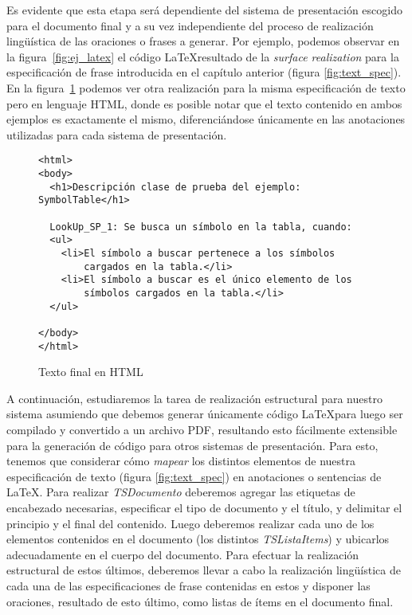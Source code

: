 Es evidente que esta etapa será dependiente del sistema de presentación escogido para el documento final y a su vez independiente del proceso de realización lingüística de las oraciones o frases a generar.  Por ejemplo, podemos observar en la figura~\ref{fig:ej_latex} el código \LaTeX resultado de la \textit{surface realization} para la especificación de frase introducida en el capítulo anterior (figura \ref{fig:text_spec}). En la figura~\ref{fig:ej_html} podemos ver otra realización para la misma especificación de texto pero en lenguaje HTML, donde es posible notar que el texto contenido en ambos ejemplos es exactamente el mismo, diferenciándose únicamente en las anotaciones utilizadas para cada sistema de presentación.

\begin{figure}[H]
  \begin{verbatim}
<html>
<body>
  <h1>Descripción clase de prueba del ejemplo: SymbolTable</h1>

  LookUp_SP_1: Se busca un símbolo en la tabla, cuando:
  <ul>
    <li>El símbolo a buscar pertenece a los símbolos 
        cargados en la tabla.</li>
    <li>El símbolo a buscar es el único elemento de los 
        símbolos cargados en la tabla.</li>
  </ul>

</body>
</html>
  \end{verbatim}
  \caption{Texto final en HTML}
  \label{fig:ej_html}
\end{figure}


A continuación, estudiaremos la tarea de realización estructural para nuestro sistema asumiendo que debemos generar únicamente código \LaTeX para luego ser compilado y convertido a un archivo PDF, resultando esto fácilmente extensible para la generación de código para otros sistemas de presentación. Para esto, tenemos que considerar cómo \emph{mapear} los distintos elementos de nuestra especificación de texto (figura \ref{fig:text_spec}) en anotaciones o sentencias de \LaTeX. Para realizar \emph{TSDocumento} deberemos agregar las etiquetas de encabezado necesarias, especificar el tipo de documento y el título, y delimitar el principio y el final del contenido. Luego deberemos realizar cada uno de los elementos contenidos en el documento (los distintos \emph{TSListaItems}) y ubicarlos adecuadamente en el cuerpo del documento. Para efectuar la realización estructural de estos últimos, deberemos llevar a cabo la realización lingüística de cada una de las especificaciones de frase contenidas en estos y disponer las oraciones, resultado de esto último, como listas de ítems en el documento final.

